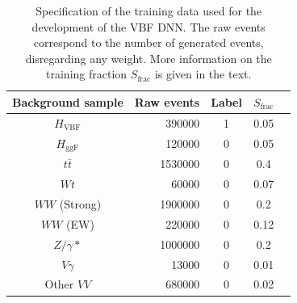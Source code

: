 \begin{table}[ht]
    \centering
    \small
    \begin{tabular}{ c  | r c c c}
        \toprule
        Background sample  & Raw events & Label & $S_\text{frac}$ \\
        \midrule
        $H_{\mathrm{VBF}}$ & 390000     & 1     & 0.05            \\
        $H_{\mathrm{ggF}}$ & 120000     & 0     & 0.05            \\
        $t\bar{t}$         & 1530000    & 0     & 0.4             \\
        $Wt$               & 60000      & 0     & 0.07            \\
        $WW$ (Strong)      & 1900000    & 0     & 0.2             \\
        $WW$ (EW)          & 220000     & 0     & 0.12            \\
        $Z/\gamma*$        & 1000000    & 0     & 0.2             \\
        $V\gamma$          & 13000      & 0     & 0.01            \\
        Other $VV$         & 680000     & 0     & 0.02            \\
        \bottomrule
    \end{tabular}
    \caption{Specification of the training data used for the development of the VBF DNN. The raw events correspond to the number of generated events, disregarding any weight. More information on the training fraction $S_\text{frac}$ is given in the text.}
    \label{tab:DNNtrainingstats}
\end{table}
